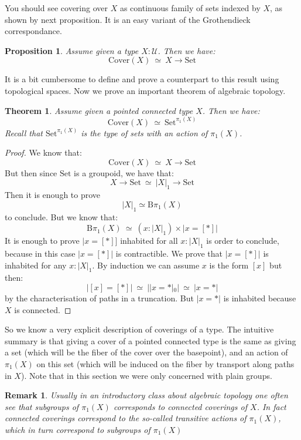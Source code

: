 \documentclass{article}
\newcommand{\U}{{\mathcal U}}
\renewcommand{\r}{\rightarrow}
\newcommand{\B}{\mathrm{B}}
\newcommand{\Set}{\mathrm{Set}}
\newtheorem{proposition}{Proposition}
\newtheorem{theorem}{Theorem}
\newtheorem{remark}{Remark}
\begin{document}
You should see covering over $X$ as continuous family of sets indexed by $X$, as shown by next proposition. It is an easy variant of the Grothendieck correspondance.

\begin{proposition}
Assume given a type $X:\U$. Then we have:
\[\mathrm{Cover}(X) \ \simeq\ X \r \Set\]
\end{proposition}

It is a bit cumbersome to define and prove a counterpart to this result using topological spaces. Now we prove an important theorem of algebraic topology.

\begin{theorem}
Assume given a pointed connected type $X$. Then we have:
\[\mathrm{Cover}(X) \ \simeq\ \Set^{\pi_1(X)}\]
Recall that $\Set^{\pi_1(X)}$ is the type of sets with an action of $\pi_1(X)$.
\end{theorem}
\begin{proof}
We know that:
\[\mathrm{Cover}(X)\ \simeq\ X\r \Set\]
But then since $\Set$ is a groupoid, we have that:
\[X\r\Set \ \simeq\ |X|_1\r \Set\]
Then it is enough to prove 
\[|X|_1 \simeq \B\pi_1(X)\] 
to conclude. But we know that:
\[\B\pi_1(X) \ \simeq \ (x:|X|_1)\times |x=[*]|\]
It is enough to prove $|x=[*]]$ inhabited for all $x:|X|_1$ is order to conclude, because in this case $|x=[*]|$ is contractible.
We prove that $|x=[*]|$ is inhabited for any $x:|X|_1$. By induction we can assume $x$ is the form $[x]$ but then:
\[|[x]=[*]| \ \simeq \ ||x=*|_0| \ \simeq\ |x=*|\]
by the characterisation of paths in a truncation. But $|x=*|$ is inhabited because $X$ is connected.
\end{proof}

So we know a very explicit description of coverings of a type. The intuitive summary is that giving a cover of a pointed connected type is the same as giving a set (which will be the fiber of the cover over the basepoint), and an action of $\pi_1(X)$ on this set (which will be induced on the fiber by transport along paths in $X$). Note that in this section we were only concerned with plain groups.


\begin{remark}
Usually in an introductory class about algebraic topology one often see that subgroups of $\pi_1(X)$ corresponds to connected coverings of $X$. In fact connected coverings correspond to the so-called \emph{transitive} actions of $\pi_1(X)$, which in turn correspond to subgroups of $\pi_1(X)$
\end{remark}
\end{document}
